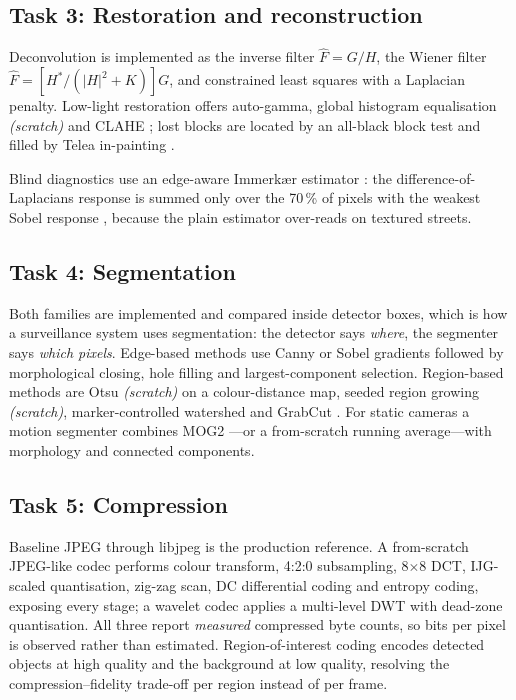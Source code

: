 \documentclass[conference,10pt]{IEEEtran}
\begin{document}
\subsection{Task 3: Restoration and reconstruction}
Deconvolution is implemented as the inverse filter $\hat{F}=G/H$, the Wiener
filter $\hat{F} = \left[H^{*}/(|H|^{2}+K)\right]G$, and constrained least
squares with a Laplacian penalty. Low-light restoration offers auto-gamma,
global histogram equalisation \emph{(scratch)} and CLAHE
\cite{zuiderveld1994clahe}; lost blocks are located by an all-black block test
and filled by Telea in-painting \cite{telea2004}.

Blind diagnostics use an edge-aware Immerk{\ae}r estimator
\cite{immerkaer1996}: the difference-of-Laplacians response is summed only over
the 70\,\% of pixels with the weakest Sobel response \cite{tai2008}, because
the plain estimator over-reads on textured streets.

\subsection{Task 4: Segmentation}
Both families are implemented and compared inside detector boxes, which is how
a surveillance system uses segmentation: the detector says \emph{where}, the
segmenter says \emph{which pixels}. Edge-based methods use Canny
\cite{canny1986} or Sobel gradients followed by morphological closing, hole
filling and largest-component selection. Region-based methods are Otsu
\emph{(scratch)} \cite{otsu1979} on a colour-distance map, seeded region
growing \emph{(scratch)}, marker-controlled watershed and
GrabCut \cite{rother2004}. For static cameras a motion segmenter combines MOG2
\cite{zivkovic2004}---or a from-scratch running average---with morphology and
connected components.

\subsection{Task 5: Compression}
Baseline JPEG through libjpeg is the production reference. A
from-scratch JPEG-like codec performs colour transform, 4:2:0 subsampling,
8$\times$8 DCT, IJG-scaled quantisation, zig-zag scan, DC differential coding
and entropy coding, exposing every stage; a wavelet codec
\cite{antonini1992} applies a multi-level DWT with dead-zone
quantisation. All three report \emph{measured} compressed byte counts, so bits
per pixel is observed rather than estimated. Region-of-interest coding encodes
detected objects at high quality and the background at low quality, resolving
the compression--fidelity trade-off per region instead of per frame.
\end{document}
